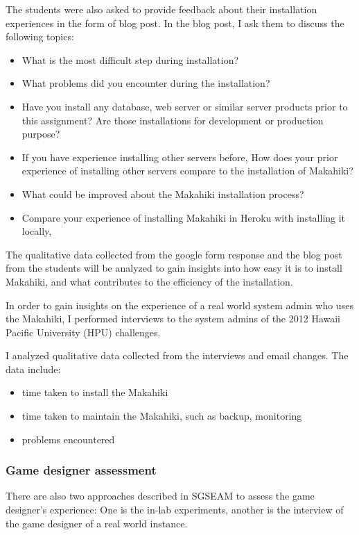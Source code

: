 The students were also asked to provide feedback about their installation experiences in the form of blog post. In the blog post, I ask them to discuss the following topics:
\begin{itemize}
\item What is the most difficult step during installation?
\item What problems did you encounter during the installation?
\item Have you install any database, web server or similar server products prior to this assignment? Are those installations for development or production purpose?
\item If you have experience installing other servers before, How does your prior experience of installing other servers compare to the installation of Makahiki?
\item What could be improved about the Makahiki installation process?
\item Compare your experience of installing Makahiki in Heroku with installing it locally,
\end{itemize}

The qualitative data collected from the google form response and the blog post from the students will be analyzed to gain insights into how easy it is to install Makahiki, and what contributes to the efficiency of the installation.

In order to gain insights on the experience of a real world system admin who uses the Makahiki, I performed interviews to the system admins of the 2012 Hawaii Pacific University (HPU) challenges.

I analyzed qualitative data collected from the interviews and email changes. The data include:
\begin{itemize}
 \item time taken to install the Makahiki
 \item time taken to maintain the Makahiki, such as backup, monitoring
 \item problems encountered
\end{itemize}

\subsubsection{Game designer assessment}

There are also two approaches described in SGSEAM to assess the game designer's experience: One is the in-lab experiments, another is the interview of the game designer of a real world instance.

